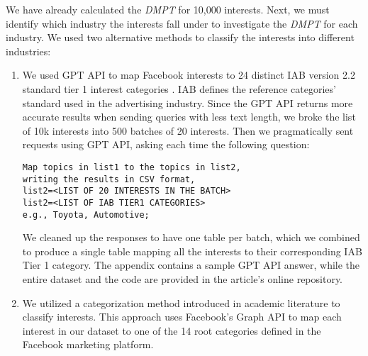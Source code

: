 \documentclass[twocolumn]{bmcart}\usepackage{lineno}
\begin{document}
We have already calculated the \emph{DMPT} for 10,000 interests. Next, we must identify which industry the interests fall under to investigate the \emph{DMPT} for each industry. We used two alternative methods to classify the interests into different industries:


\begin{enumerate}

\item We used GPT API to map Facebook interests to 24  
distinct IAB version 2.2 standard tier 1 interest categories \cite{IABTechLab}. IAB defines the reference categories' standard used in the advertising industry. Since the GPT API returns more accurate results when sending queries with less text length, we broke the list of 10k interests into 500 batches of 20 interests. Then we pragmatically sent requests using GPT API, asking each time the following question:

\begin{verbatim}
Map topics in list1 to the topics in list2,
writing the results in CSV format,
list2=<LIST OF 20 INTERESTS IN THE BATCH>
list2=<LIST OF IAB TIER1 CATEGORIES>
e.g., Toyota, Automotive;
\end{verbatim}

 We cleaned up the responses to have one table per batch, which we combined to produce a single table mapping all the interests to their corresponding IAB Tier 1 category. The appendix contains a sample GPT API answer, while the entire dataset and the code are provided in the article's online repository. 


\item We utilized a categorization method introduced in academic literature \cite{cuevas2021gender} to classify interests. This approach uses Facebook's Graph API to map each interest in our dataset to one of the  14 root categories defined in the Facebook marketing platform. 

\end{enumerate}
\end{document}
